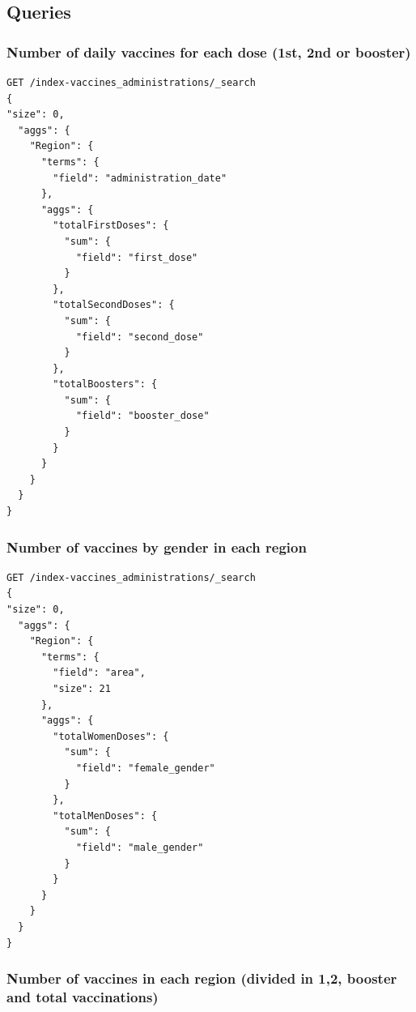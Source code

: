 \documentclass[12pt, a4paper]{article}
\begin{document}
\subsection{Queries} 
\subsubsection{Number of daily vaccines for each dose (1st, 2nd or booster)}

\begin{tcolorbox}[fontupper=\scriptsize]
    \begin{verbatim}
GET /index-vaccines_administrations/_search
{
"size": 0, 
  "aggs": {
    "Region": {
      "terms": {
        "field": "administration_date"
      },
      "aggs": {
        "totalFirstDoses": {
          "sum": {
            "field": "first_dose"
          }
        },        
        "totalSecondDoses": {
          "sum": {
            "field": "second_dose"
          }
        },        
        "totalBoosters": {
          "sum": {
            "field": "booster_dose"
          }
        }
      }
    }
  } 
}

    \end{verbatim}
\end{tcolorbox}

\subsubsection{Number of vaccines by gender in each region}

\begin{tcolorbox}[fontupper=\scriptsize]
    \begin{verbatim}
GET /index-vaccines_administrations/_search
{
"size": 0, 
  "aggs": {
    "Region": {
      "terms": {
        "field": "area",
        "size": 21
      },
      "aggs": {
        "totalWomenDoses": {
          "sum": {
            "field": "female_gender"
          }
        },        
        "totalMenDoses": {
          "sum": {
            "field": "male_gender"
          }
        }
      }
    }
  } 
}

    \end{verbatim}
\end{tcolorbox}

\subsubsection{Number of vaccines in each region (divided in 1,2, booster and total vaccinations)}
\end{document}
